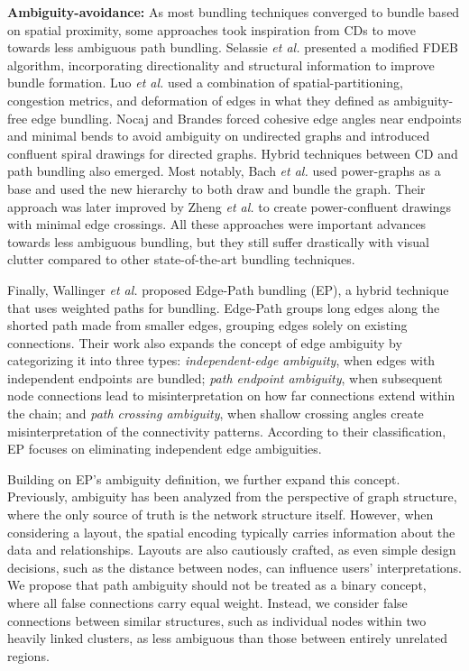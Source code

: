 \textbf{Ambiguity-avoidance:} As most bundling techniques converged to bundle based on spatial proximity, some approaches took inspiration from CDs to move towards less ambiguous path bundling. Selassie \textit{et al.}\cite{selassie:2011} presented a modified FDEB algorithm, incorporating directionality and structural information to improve bundle formation. Luo \textit{et al.}\cite{luo:2012} used a combination of spatial-partitioning, congestion metrics, and deformation of edges in what they defined as ambiguity-free edge bundling. Nocaj and Brandes\cite{nocaj:2013} forced cohesive edge angles near endpoints and minimal bends to avoid ambiguity on undirected graphs and introduced confluent spiral drawings for directed graphs. Hybrid techniques between CD and path bundling also emerged. Most notably, Bach \textit{et al.}\cite{bach:2016} used power-graphs as a base and used the new hierarchy to both draw and bundle the graph. Their approach was later improved by Zheng \textit{et al.}\cite{zheng:2021} to create power-confluent drawings with minimal edge crossings. All these approaches were important advances towards less ambiguous bundling, but they still suffer drastically with visual clutter compared to other state-of-the-art bundling techniques.

Finally, Wallinger \textit{et al.}\cite{wallinger:2022} proposed Edge-Path bundling (EP), a hybrid technique that uses weighted paths for bundling. Edge-Path groups long edges along the shorted path made from smaller edges, grouping edges solely on existing connections. Their work also expands the concept of edge ambiguity by categorizing it into three types: \emph{independent-edge ambiguity}, when edges with independent endpoints are bundled; \emph{path endpoint ambiguity}, when subsequent node connections lead to misinterpretation on how far connections extend within the chain; and \emph{path crossing ambiguity}, when shallow crossing angles create misinterpretation of the connectivity patterns. According to their classification, EP focuses on eliminating independent edge ambiguities.

Building on EP's ambiguity definition, we further expand this concept. Previously, ambiguity has been analyzed from the perspective of graph structure, where the only source of truth is the network structure itself. However, when considering a layout, the spatial encoding typically carries information about the data and relationships. Layouts are also cautiously crafted, as even simple design decisions, such as the distance between nodes, can influence users' interpretations\cite{mcgrath:1996,fabrikant:2008}. We propose that path ambiguity should not be treated as a binary concept, where all false connections carry equal weight. Instead, we consider false connections between similar structures, such as individual nodes within two heavily linked clusters, as less ambiguous than those between entirely unrelated regions.

